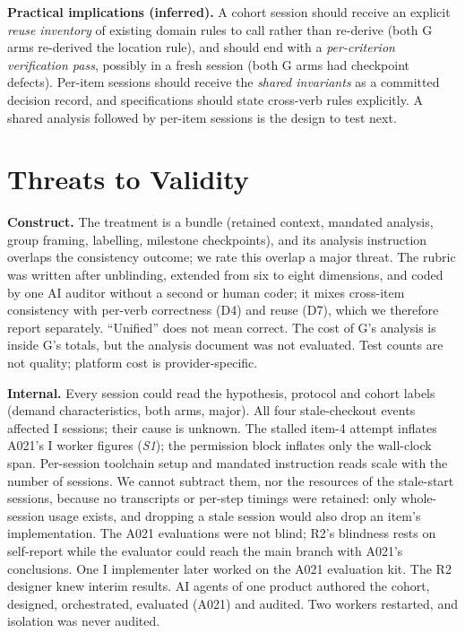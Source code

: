 \documentclass[10pt,conference]{IEEEtran}
\newcommand{\G}{G}
\newcommand{\I}{I}
\begin{document}
\textbf{Practical implications (inferred).} A cohort session should receive an explicit \emph{reuse inventory} of existing domain rules to call rather than re-derive (both \G{} arms re-derived the location rule), and should end with a \emph{per-criterion verification pass}, possibly in a fresh session (both \G{} arms had checkpoint defects). Per-item sessions should receive the \emph{shared invariants} as a committed decision record, and specifications should state cross-verb rules explicitly. A shared analysis followed by per-item sessions is the design to test next. %

\section{Threats to Validity}\label{sec:threats}

\textbf{Construct.} The treatment is a bundle (retained context, mandated analysis, group framing, labelling, milestone checkpoints), and its analysis instruction overlaps the consistency outcome; we rate this overlap a major threat. The rubric was written after unblinding, extended from six to eight dimensions, and coded by one AI auditor without a second or human coder; it mixes cross-item consistency with per-verb correctness (D4) and reuse (D7), which we therefore report separately. ``Unified'' does not mean correct. The cost of \G's analysis is inside \G's totals, but the analysis document was not evaluated. Test counts are not quality; platform cost is provider-specific. %

\textbf{Internal.} Every session could read the hypothesis, protocol and cohort labels (demand characteristics, both arms, major). All four stale-checkout events affected \I{} sessions; their cause is unknown. The stalled item-4 attempt inflates A021's \I{} worker figures (\emph{S1}); the permission block inflates only the wall-clock span. Per-session toolchain setup and mandated instruction reads scale with the number of sessions. We cannot subtract them, nor the resources of the stale-start sessions, because no transcripts or per-step timings were retained: only whole-session usage exists, and dropping a stale session would also drop an item's implementation. The A021 evaluations were not blind; R2's blindness rests on self-report while the evaluator could reach the main branch with A021's conclusions. One \I{} implementer later worked on the A021 evaluation kit. The R2 designer knew interim results. AI agents of one product authored the cohort, designed, orchestrated, evaluated (A021) and audited. Two workers restarted, and isolation was never audited. %
\end{document}
